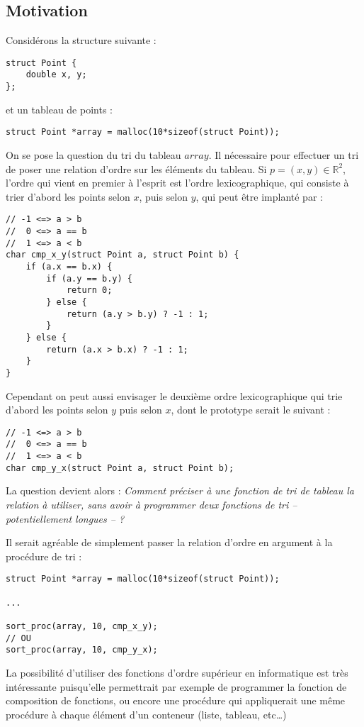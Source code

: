 \documentclass[../../../main.tex]{subfiles}
\begin{document}
\subsection{Motivation}
\label{sub:motivation_pointeurs_routines}
Considérons la structure suivante :
\begin{verbatim}
struct Point {
	double x, y;
};
\end{verbatim}
et un tableau de points :
\begin{verbatim}
struct Point *array = malloc(10*sizeof(struct Point));
\end{verbatim}
On se pose la question du tri du tableau $array$. Il nécessaire pour effectuer un tri de poser une relation d'ordre sur les éléments du tableau. Si $p = (x, y)\in\mathbb{R}^{2}$, l'ordre qui vient en premier à l'esprit est l'ordre lexicographique, qui consiste à trier d'abord les points selon $x$, puis selon $y$, qui peut être implanté par :
\begin{verbatim}
// -1 <=> a > b
//  0 <=> a == b
//  1 <=> a < b
char cmp_x_y(struct Point a, struct Point b) {
	if (a.x == b.x) {
		if (a.y == b.y) {
			return 0;
		} else {
			return (a.y > b.y) ? -1 : 1;
		}
	} else {
		return (a.x > b.x) ? -1 : 1;
	}
}
\end{verbatim}
Cependant on peut aussi envisager le deuxième ordre lexicographique qui trie d'abord les points selon $y$ puis selon $x$, dont le prototype serait le suivant :
\begin{verbatim}
// -1 <=> a > b
//  0 <=> a == b
//  1 <=> a < b
char cmp_y_x(struct Point a, struct Point b);
\end{verbatim}
La question devient alors : \textit{Comment préciser à une fonction de tri de tableau la relation à utiliser, sans avoir à programmer deux fonctions de tri -- potentiellement longues -- ?}

Il serait agréable de simplement passer la relation d'ordre en argument à la procédure de tri :
\begin{verbatim}
struct Point *array = malloc(10*sizeof(struct Point));

...

sort_proc(array, 10, cmp_x_y);
// OU
sort_proc(array, 10, cmp_y_x);
\end{verbatim}
La possibilité d'utiliser des fonctions d'ordre supérieur en informatique est très intéressante puisqu'elle permettrait par exemple de programmer la fonction de composition de fonctions, ou encore une procédure qui appliquerait une même procédure à chaque élément d'un conteneur (liste, tableau, etc\dots)
\end{document}
